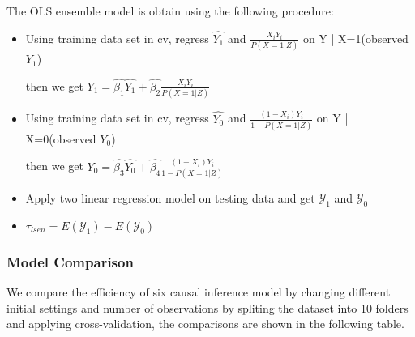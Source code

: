 \documentclass{elegantpaper}
\begin{document}
The OLS ensemble model is obtain using the following procedure:
\begin{itemize} 
\item Using training data set in cv, regress $\widehat{Y_1}$ and $\frac{X_{i} Y_{i}}{P(X=1 | Z)}$ on Y | X=1(observed $Y_1$)

then we get $Y_1 = \hat{\beta_1} \widehat{Y_1} + \hat{\beta_2} \frac{X_{i} Y_{i}}{P(X=1 | Z)}$

\item Using training data set in cv, regress $\widehat{Y_0}$ and $\frac{\left(1-X_{i}\right) Y_{i}}{1-P(X=1 | Z)}$ on Y | X=0(observed $Y_0$)

then we get $Y_0 = \hat{\beta_3} \widehat{Y_0} + \hat{\beta_4} \frac{\left(1-X_{i}\right) Y_{i}}{1-P(X=1 | Z)}$
\item Apply two linear regression model on testing data and get $\mathcal{Y}_1$ and $\mathcal{Y}_0$
\item $\tau_{lsen} = E(\mathcal{Y}_1) - E(\mathcal{Y}_0)$
\end{itemize}  

\subsubsection{Model Comparison}
We compare the efficiency of six causal inference model by changing different initial settings and number of observations by spliting the dataset into 10 folders and applying cross-validation, the comparisons are shown in the following table.
\bigskip
\end{document}
